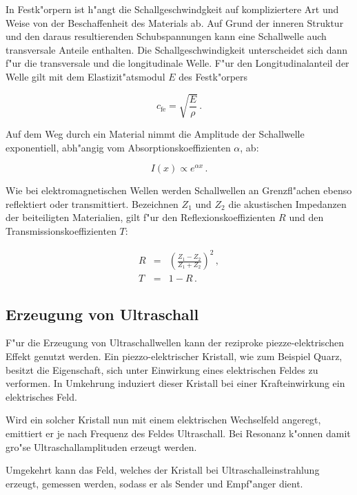 		In Festk"orpern ist h"angt die Schallgeschwindgkeit auf kompliziertere Art und Weise von der Beschaffenheit des Materials ab.
		Auf Grund der inneren Struktur und den daraus resultierenden Schubspannungen kann eine Schallwelle auch transversale Anteile enthalten.
		Die Schallgeschwindigkeit unterscheidet sich dann f"ur die transversale und die longitudinale Welle.
		F"ur den Longitudinalanteil der Welle gilt mit dem Elastizit"atsmodul $E$ des Festk"orpers

		\begin{equation}
			c_\mathrm{fe} = \sqrt{\frac{E}{\rho}} \,.
		\end{equation}

		
		\clearpage
		Auf dem Weg durch ein Material nimmt die Amplitude der Schallwelle exponentiell, abh"angig vom Absorptionskoeffizienten $\alpha$, ab:

		\begin{equation}
			I(x) \propto e^{\alpha x} \,.
		\end{equation}

		Wie bei elektromagnetischen Wellen werden Schallwellen an Grenzfl"achen ebenso reflektiert oder transmittiert.
		Bezeichnen $Z_1$ und $Z_2$ die akustischen Impedanzen der beiteiligten Materialien, gilt f"ur den Reflexionskoeffizienten $R$ und den Transmissionskoeffizienten $T$:

		\begin{eqnarray}
			R & = & \left(\frac{Z_1 - Z_2}{Z_1 + Z_2}\right)^2 \,, \\
			T & = & 1 - R \,.
		\end{eqnarray}

	\subsection{Erzeugung von Ultraschall}
	\label{subsec:erzeugung}
		F"ur die Erzeugung von Ultraschallwellen kann der reziproke piezze-elektrischen Effekt genutzt werden.
		Ein piezzo-elektrischer Kristall, wie zum Beispiel Quarz, besitzt die Eigenschaft, sich unter Einwirkung eines elektrischen Feldes zu verformen.
		In Umkehrung induziert dieser Kristall bei einer Krafteinwirkung ein elektrisches Feld.

		Wird ein solcher Kristall nun mit einem elektrischen Wechselfeld angeregt, emittiert er je nach Frequenz des Feldes Ultraschall.
		Bei Resonanz k"onnen damit gro"se Ultraschallamplituden erzeugt werden.

		Umgekehrt kann das Feld, welches der Kristall bei Ultraschalleinstrahlung erzeugt, gemessen werden, sodass er als Sender und Empf"anger dient.

